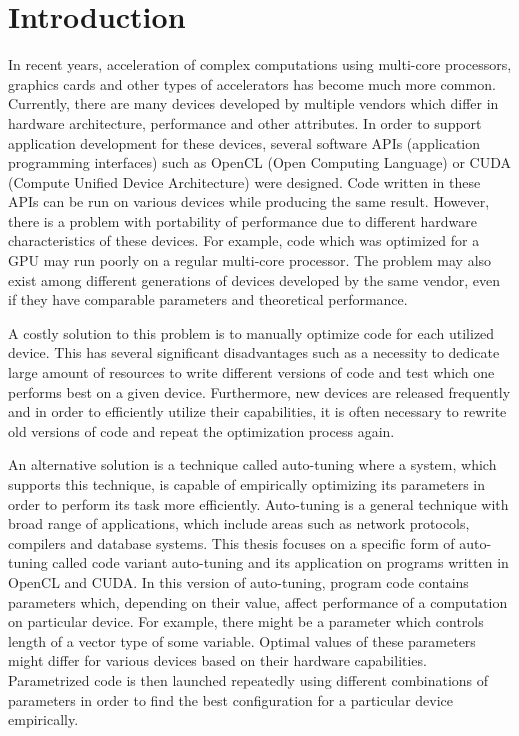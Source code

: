 \documentclass
[
    digital, %
    oneside, %
    table, %
    nolof, %
    nolot, %
    nocover %
]{fithesis3}
\begin{document}
\chapter{Introduction}
In recent years, acceleration of complex computations using multi-core processors, graphics cards and other types of accelerators has become
much more common. Currently, there are many devices developed by multiple vendors which differ in hardware architecture, performance and other
attributes. In order to support application development for these devices, several software APIs (application programming interfaces) such as
OpenCL (Open Computing Language) or CUDA (Compute Unified Device Architecture) were designed. Code written in these APIs can be run on various
devices while producing the same result. However, there is a problem with portability of performance due to different hardware characteristics of
these devices. For example, code which was optimized for a GPU may run poorly on a regular multi-core processor. The problem may also exist among
different generations of devices developed by the same vendor, even if they have comparable parameters and theoretical performance.

A costly solution to this problem is to manually optimize code for each utilized device. This has several significant disadvantages such as
a necessity to dedicate large amount of resources to write different versions of code and test which one performs best on a given device. Furthermore,
new devices are released frequently and in order to efficiently utilize their capabilities, it is often necessary to rewrite old versions of code and
repeat the optimization process again.

An alternative solution is a technique called auto-tuning where a system, which supports this technique, is capable of empirically optimizing its
parameters in order to perform its task more efficiently. Auto-tuning is a general technique with broad range of applications, which include areas such
as network protocols, compilers and database systems. This thesis focuses on a specific form of auto-tuning called code variant auto-tuning and its
application on programs written in OpenCL and CUDA. In this version of auto-tuning, program code contains parameters which, depending on their value,
affect performance of a computation on particular device. For example, there might be a parameter which controls length of a vector type of some variable.
Optimal values of these parameters might differ for various devices based on their hardware capabilities. Parametrized code is then launched repeatedly
using different combinations of parameters in order to find the best configuration for a particular device empirically.
\end{document}
